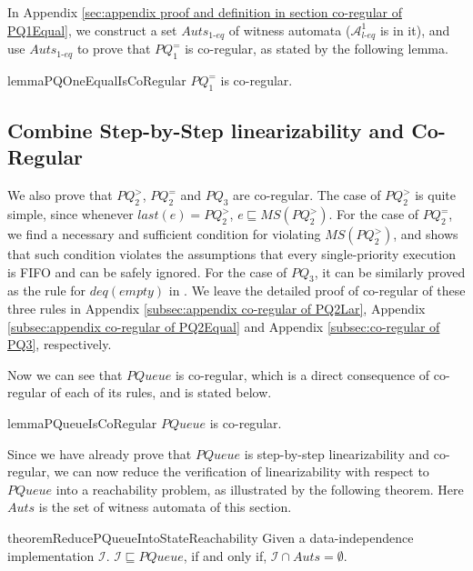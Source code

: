 In Appendix \ref{sec:appendix proof and definition in section co-regular of PQ1Equal}, we construct a set $\textit{Auts}_{\textit{1-eq}}$ of witness automata ($\mathcal{A}_{\textit{l-eq}}^1$ is in it), and use $\textit{Auts}_{\textit{1-eq}}$ to prove that $\textit{PQ}_1^{=}$ is co-regular, as stated by the following lemma.


\begin{restatable}{lemma}{PQOneEqualIsCoRegular}
\label{lemma:Rpr2 is co-regular}
$\textit{PQ}_1^{=}$ is co-regular.
\end{restatable}




\subsection{Combine Step-by-Step linearizability and Co-Regular}
\label{subsec:combine step-by-step linearizability and co-regular}

We also prove that $\textit{PQ}_2^{>}$, $\textit{PQ}_2^{=}$ and $\textit{PQ}_3$ are co-regular. The case of $\textit{PQ}_2^{>}$ is quite simple, since whenever $\textit{last}(e) = \textit{PQ}_2^{>}$, $e \sqsubseteq \textit{MS}(\textit{PQ}_2^{>})$. For the case of $\textit{PQ}_2^{=}$, we find a necessary and sufficient condition for violating $\textit{MS}(\textit{PQ}_2^{>})$, and shows that such condition violates the assumptions that every single-priority execution is FIFO and can be safely ignored. For the case of $\textit{PQ}_3$, it can be similarly proved as the rule for $\textit{deq}(\textit{empty})$ in \cite{Bouajjani:2015}. We leave the detailed proof of co-regular of these three rules in Appendix \ref{subsec:appendix co-regular of PQ2Lar}, Appendix \ref{subsec:appendix co-regular of PQ2Equal} and Appendix \ref{subsec:co-regular of PQ3}, respectively.

Now we can see that $\textit{PQueue}$ is co-regular, which is a direct consequence of co-regular of each of its rules, and is stated below.

\begin{restatable}{lemma}{PQueueIsCoRegular}
\label{lemma:PQueue is co-regular}
$\textit{PQueue}$ is co-regular.
\end{restatable}

Since we have already prove that $\textit{PQueue}$ is step-by-step linearizability and co-regular, we can now reduce the verification of linearizability with respect to $\textit{PQueue}$ into a reachability problem, as illustrated by the following theorem. Here $\textit{Auts}$ is the set of witness automata of this section.

\begin{restatable}{theorem}{ReducePQueueIntoStateReachability}
\label{lemma:reduce PQueue into state reachability}
Given a data-independence implementation $\mathcal{I}$. $\mathcal{I} \sqsubseteq \textit{PQueue}$, if and only if, $\mathcal{I} \cap \textit{Auts} = \emptyset$.
\end{restatable}



